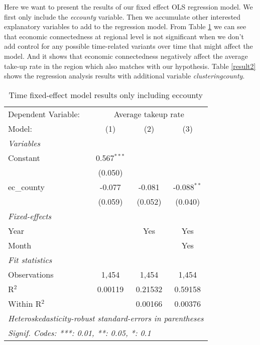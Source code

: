 \documentclass{article}
\begin{document}
Here we want to present the results of our fixed effect OLS regression model. We first only include the \textit{ec\textunderscore county} variable. Then we accumulate other interested explanatory variables to add to the regression model. From Table \ref{result1} we can see that economic connectedness at regional level is not significant when we don't add control for any possible time-related variants over time that might affect the model. And it shows that economic connectedness negatively affect the average take-up rate in the region which also matches with our hypothesis.  Table \ref{result2} shows the regression analysis results with additional variable \textit{clustering\textunderscore county}. 



\begin{table}[htbp]
   \centering
   \begin{tabular}{lccc}
      \tabularnewline \midrule \midrule
      Dependent Variable: & \multicolumn{3}{c}{Average takeup rate}\\
      Model:       & (1)           & (2)     & (3)\\  
      \midrule
      \emph{Variables}\\
      Constant     & 0.567$^{***}$ &         &   \\   
                   & (0.050)       &         &   \\   
      ec\_county   & -0.077        & -0.081  & -0.088$^{**}$\\   
                   & (0.059)       & (0.052) & (0.040)\\   
      \midrule
      \emph{Fixed-effects}\\
      Year         &               & Yes     & Yes\\  
      Month        &               &         & Yes\\  
      \midrule
      \emph{Fit statistics}\\
      Observations & 1,454         & 1,454   & 1,454\\  
      R$^2$        & 0.00119       & 0.21532 & 0.59158\\  
      Within R$^2$ &               & 0.00166 & 0.00376\\  
      \midrule \midrule
      \multicolumn{4}{l}{\emph{Heteroskedasticity-robust standard-errors in parentheses}}\\
      \multicolumn{4}{l}{\emph{Signif. Codes: ***: 0.01, **: 0.05, *: 0.1}}\\
   \end{tabular}
   \caption{Time fixed-effect model results only including ec\textunderscore county}
      \label{result1}
\end{table}
\end{document}
